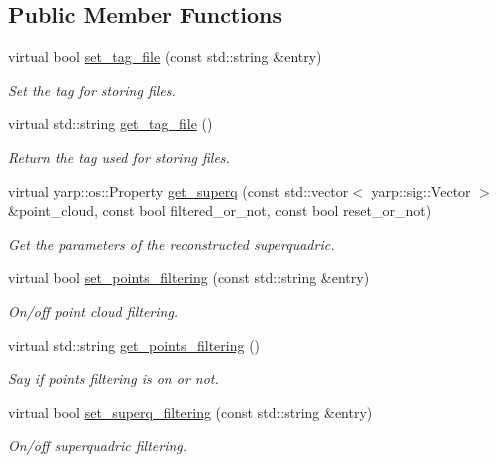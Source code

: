 \subsection*{Public Member Functions}
\begin{DoxyCompactItemize}
\item 
virtual bool \hyperlink{classsuperquadricModel__IDL_a781426bfc4862e87ef75a4bbbfa33275}{set\-\_\-tag\-\_\-file} (const std\-::string \&entry)
\begin{DoxyCompactList}\small\item\em Set the tag for storing files. \end{DoxyCompactList}\item 
virtual std\-::string \hyperlink{classsuperquadricModel__IDL_a6d39eaa247aec65fe2bfefbdace4ec85}{get\-\_\-tag\-\_\-file} ()
\begin{DoxyCompactList}\small\item\em Return the tag used for storing files. \end{DoxyCompactList}\item 
virtual yarp\-::os\-::\-Property \hyperlink{classsuperquadricModel__IDL_a10039bb93445066d9dd29d8f6c9ef6c5}{get\-\_\-superq} (const std\-::vector$<$ yarp\-::sig\-::\-Vector $>$ \&point\-\_\-cloud, const bool filtered\-\_\-or\-\_\-not, const bool reset\-\_\-or\-\_\-not)
\begin{DoxyCompactList}\small\item\em Get the parameters of the reconstructed superquadric. \end{DoxyCompactList}\item 
virtual bool \hyperlink{classsuperquadricModel__IDL_a1a2080d797a81b46b0dffa86b5367e15}{set\-\_\-points\-\_\-filtering} (const std\-::string \&entry)
\begin{DoxyCompactList}\small\item\em On/off point cloud filtering. \end{DoxyCompactList}\item 
virtual std\-::string \hyperlink{classsuperquadricModel__IDL_aa490ebcf39414aaaae41d5095267abb9}{get\-\_\-points\-\_\-filtering} ()
\begin{DoxyCompactList}\small\item\em Say if points filtering is on or not. \end{DoxyCompactList}\item 
virtual bool \hyperlink{classsuperquadricModel__IDL_af418edf09afd9374c5272d018c58e8a7}{set\-\_\-superq\-\_\-filtering} (const std\-::string \&entry)
\begin{DoxyCompactList}\small\item\em On/off superquadric filtering. \end{DoxyCompactList}\item 

\end{DoxyCompactItemize}
